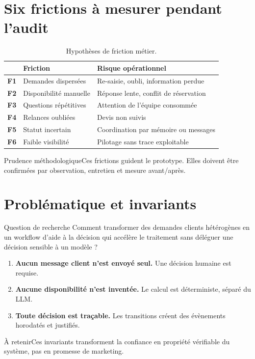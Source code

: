 \documentclass[11pt,a4paper,openany]{report}
\newcommand{\takeaway}[1]{\begin{keybox}{À retenir}#1\end{keybox}}
\begin{document}
\section{Six frictions à mesurer pendant l'audit}
\begin{table}[H]\centering\small
\caption{Hypothèses de friction métier.}\begin{tabularx}{\linewidth}{>{\bfseries}c X X}\toprule
 & Friction & Risque opérationnel\\\midrule
F1 & Demandes dispersées & Re-saisie, oubli, information perdue\\
F2 & Disponibilité manuelle & Réponse lente, conflit de réservation\\
F3 & Questions répétitives & Attention de l'équipe consommée\\
F4 & Relances oubliées & Devis non suivis\\
F5 & Statut incertain & Coordination par mémoire ou messages\\
F6 & Faible visibilité & Pilotage sans trace exploitable\\\bottomrule
\end{tabularx}\end{table}
\begin{riskbox}{Prudence méthodologique}Ces frictions guident le prototype. Elles doivent être confirmées par observation, entretien et mesure avant/après.\end{riskbox}
\clearpage

\section{Problématique et invariants}
\begin{keybox}{Question de recherche}
Comment transformer des demandes clients hétérogènes en un workflow d'aide à la décision qui accélère le traitement sans déléguer une décision sensible à un modèle ?
\end{keybox}
\begin{enumerate}[leftmargin=1.2cm,itemsep=8pt]
\item \textbf{Aucun message client n'est envoyé seul.} Une décision humaine est requise.
\item \textbf{Aucune disponibilité n'est inventée.} Le calcul est déterministe, séparé du LLM.
\item \textbf{Toute décision est traçable.} Les transitions créent des évènements horodatés et justifiés.
\end{enumerate}
\takeaway{Ces invariants transforment la confiance en propriété vérifiable du système, pas en promesse de marketing.}
\clearpage
\end{document}
